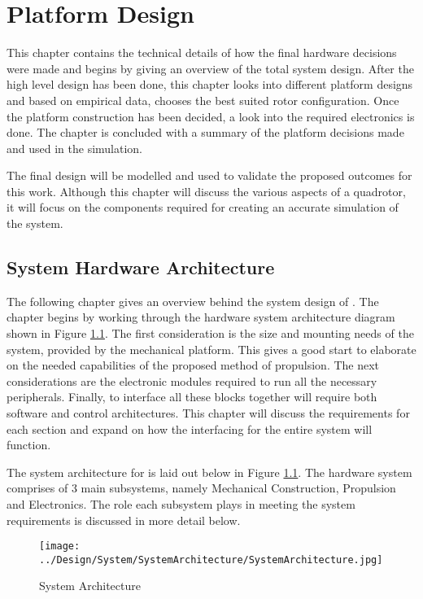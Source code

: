 \chapter{Platform Design}
This chapter contains the technical details of how the final hardware decisions were made and begins by giving an overview of the total system design. After the high level design has been done, this chapter looks into different platform designs and based on empirical data, chooses the best suited rotor configuration. Once the platform construction has been decided, a look into the required electronics is done. The chapter is concluded with a summary of the platform decisions made and used in the simulation.

The final design will be modelled and used to validate the proposed outcomes for this work. Although this chapter will discuss the various aspects of a quadrotor, it will focus on the components required for creating an accurate simulation of the system.

	\section{System Hardware Architecture}
	The following chapter gives an overview behind the system design of \projectName. The chapter begins by working through the hardware system architecture diagram shown in Figure \ref{IM_SystemArchitecture}. The first consideration is the size and mounting needs of the system, provided by the mechanical platform. This gives a good start to elaborate on the needed capabilities of the proposed method of propulsion. The next considerations are the electronic modules required to run all the necessary peripherals. Finally, to interface all these blocks together will require both software and control architectures. This chapter will discuss the requirements for each section and expand on how the interfacing for the entire system will function.
	
	The system architecture for \projectName is laid out below in Figure \ref{IM_SystemArchitecture}. The hardware system comprises of 3 main subsystems, namely Mechanical Construction, Propulsion and Electronics. The role each subsystem plays in meeting the system requirements is discussed in more detail below.
	
	\begin{figure}[H]
		\centering
		\texttt{[image: ../Design/System/SystemArchitecture/SystemArchitecture.jpg]}
		\caption{System Architecture}
		\label{IM_SystemArchitecture}
	\end{figure}

